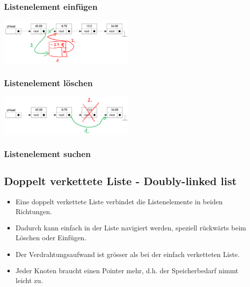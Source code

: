 \begin{multicols}{2}
\subsubsection{Listenelement einfügen}
\begin{flushleft}
{\includegraphics[width=0.5\textwidth]{images/Listen/SLL_Insert.png}}
\label{Fig: Element bei SLL einf"ugen}
\end{flushleft}


\subsubsection{Listenelement löschen}
\begin{flushleft}
{\includegraphics[width=0.5\textwidth]{images/Listen/SLL_Delete.png}}
\label{Fig: Element bei SLL l"oschen}
\end{flushleft}

\end{multicols}

\subsubsection{Listenelement suchen}



\subsection{Doppelt verkettete Liste - Doubly-linked list}
\begin{itemize}
  \item Eine doppelt verkettete Liste verbindet die Listenelemente in beiden Richtungen.
  \item Dadurch kann einfach in der Liste navigiert werden, speziell rückwärts beim Löschen oder Einfügen.
  \item Der Verdrahtungsaufwand ist grösser als bei der einfach verketteten Liste.
  \item Jeder Knoten braucht einen Pointer mehr, d.h. der Speicherbedarf nimmt leicht zu.
\end{itemize}

